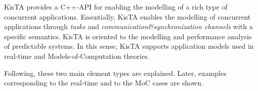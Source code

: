 
KisTA provides a C++-API for enabling the modelling of a rich type of
concurrent applications.
Essentially, KisTA enables the modelling of concurrent applications through
\emph{tasks} and \emph{communication\&synchronization channels} with a specific semantics.
%
KisTA is oriented to the modelling and performance analysis of predictable systems.
In this sense, KisTA supports application models used in real-time and Models-of-Computation
theories.

Following, these two main element types are explained.
Later, examples corresponding to the real-time and to the MoC cases are shown.


